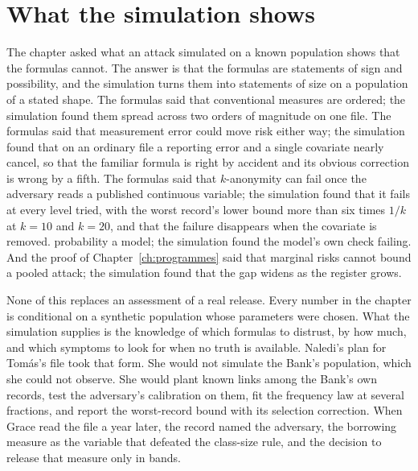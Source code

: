 \section{What the simulation shows}

The chapter asked what an attack simulated on a known population shows that the
formulas cannot. The answer is that the formulas are statements of sign and
possibility, and the simulation turns them into statements of size on a population
of a stated shape. The formulas said that conventional measures are ordered; the
simulation found them spread across two orders of magnitude on one file. The
formulas said that measurement error could move risk either way; the simulation
found that on an ordinary file a reporting error and a single covariate nearly
cancel, so that the familiar formula is right by accident and its obvious correction
is wrong by a fifth. The formulas said that $k$-anonymity can fail once the adversary
reads a published continuous variable; the simulation found that it fails at every
level tried, with the worst record's lower bound more than six times $1/k$ at
$k = 10$ and $k = 20$, and that the failure disappears when the covariate is
removed.
probability a model; the simulation found the model's own check failing. And the
proof of Chapter~\ref{ch:programmes} said that marginal risks cannot bound a pooled
attack; the simulation found that the gap widens as the register grows.

None of this replaces an assessment of a real release. Every number in the chapter is
conditional on a synthetic population whose parameters were chosen. What the
simulation supplies is the knowledge of which formulas to distrust, by how much, and
which symptoms to look for when no truth is available. Naledi's plan for Tomás's file
took that form. She would not simulate the Bank's population, which she could not
observe. She would plant known links among the Bank's own records, test the
adversary's calibration on them, fit the frequency law at several fractions, and
report the worst-record bound with its selection correction. When Grace read the file
a year later, the record named the adversary, the borrowing measure as the variable
that defeated the class-size rule, and the decision to release that measure only in
bands.

